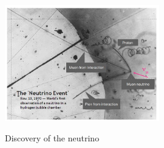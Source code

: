 \begin{figure}[!h]
    \centering
    \includegraphics[width=0.6\textwidth]{Figures/FNSN31_14.JPG}
    \label{fig:muon1}
    \caption{Discovery of the neutrino}
\end{figure}
